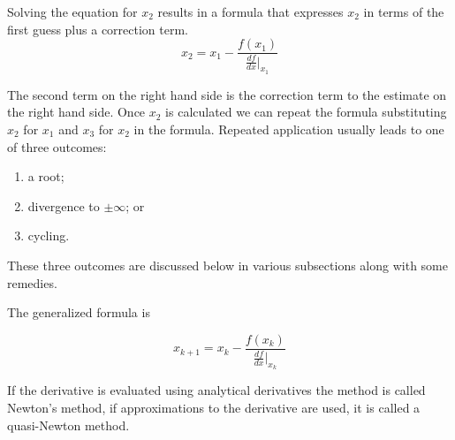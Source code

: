 Solving the equation for $x_2$ results in a formula that expresses $x_2$ in terms of the first guess plus a correction term.
\begin{equation}
x_2=x_1 - \frac{f(x_1)}{\frac{df}{dx}\vert_{x_1}} 
\end{equation}

The second term on the right hand side is the correction term to the estimate on the right hand side.  
Once $x_2$ is calculated we can repeat the formula substituting $x_2$ for $x_1$ and $x_3$ for $x_2$ in the formula.  
Repeated application usually leads to one of three outcomes:
\begin{enumerate}
\item a root;
\item divergence to $\pm\infty$; or 
\item cycling.
\end{enumerate}

These three outcomes are discussed below in various subsections along with some remedies.


The generalized formula is 

\begin{equation}
x_{k+1}=x_{k} - \frac{  f(x_{k})  }{   \frac{df}{dx}\rvert_{x_k} } 
\label{eqn:NewtonFormula}
\end{equation}

If the derivative is evaluated using analytical derivatives the method is called Newton's method, if approximations to the derivative are used, it is called a quasi-Newton method.

